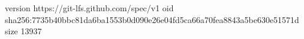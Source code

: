 version https://git-lfs.github.com/spec/v1
oid sha256:7735b40bbc81da6ba1553b0d090e26e04fd5ca66a70fea8843a5be630e51571d
size 13937

